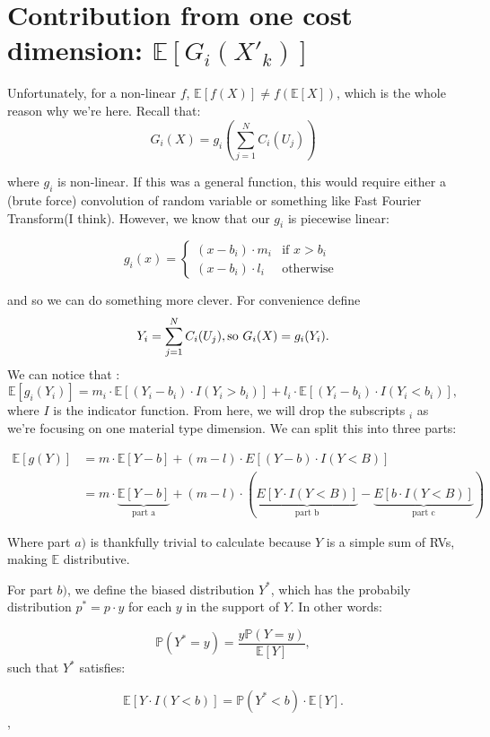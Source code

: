 \documentclass[a4paper,11pt]{article}
\begin{document}
\section{Contribution from one cost dimension: $\mathbb{E}[  G_i(X'_k) ]$}\label{one_dimension_section}

Unfortunately, for a non-linear $f$,  $ \mathbb{E}[f(X)] \neq  f(\mathbb{E}[X])$, which is the whole reason why we're here. Recall that:
$$
G_i(X) = g_i ( \sum^N_{j=1}C_i(U_j))
$$

where $g_i$ is non-linear. If this was a general function, this would require either a (brute force) convolution of random variable or something like Fast Fourier Transform(I think). However, we know that our $g_i$ is piecewise linear:

$$
g_i(x) =  \begin{cases}
  (x - b_i) \cdot   m_i  & \text{if } x > b_i \\
     (x - b_i) \cdot   l_i& \text{otherwise }
\end{cases}
$$

and so we can do something more clever. For convenience define
$$
Y_i=\sum^N_{j=1}C_i(U_j),\\
 \text{so } G_i(X) = g_i(Y_i).
$$
We can notice that :
$$
\mathbb{E}[g_i(Y_i)] = m_i \cdot \mathbb{E}[(Y_i-b_i) \cdot I( Y_i > b_i)] + l_i \cdot  \mathbb{E}[(Y_i-b_i) \cdot I( Y_i < b_i)],
$$
where $I$ is the indicator function. From here, we will drop the subscripts $_i$ as we're focusing on one material type dimension. We can split this into three parts:

\begin{align*}
\mathbb{E}[g(Y)] &= m \cdot \mathbb{E}[Y-b] + (m-l) \cdot E[(Y-b) \cdot I(Y<B)] \nonumber\\
&= m \cdot \underbrace{\mathbb{E}[Y-b]}_{\text{part a}} + (m-l) \cdot (\underbrace{E[Y \cdot I(Y<B)]}_{\text{part b}} - \underbrace{E[b \cdot I(Y<B)]}_{\text{part c}})
\end{align*}

Where part $a)$ is thankfully trivial to calculate because $Y$ is a simple sum of RVs, making $\mathbb{E}$ distributive.

For part $b)$, we define the biased distribution $Y^*$, which has the probabily distribution $p^* = p \cdot y$ for each $y$ in the support of $Y$. In other words:

$$
\mathbb{P}(Y^* = y) = \frac{y \mathbb{P} (Y=y)}{\mathbb{E}[Y]},
$$
such that $Y^*$ satisfies:

$$
 \mathbb{E}[Y \cdot I( Y < b)] = \mathbb{P}(Y^* < b) \cdot \mathbb{E}[Y].
$$,
\end{document}
